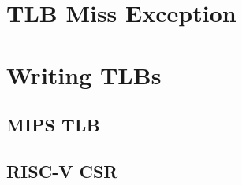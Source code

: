 



\section{TLB Miss Exception}






\section{Writing TLBs}
%

\subsection{MIPS TLB}

\subsection{RISC-V CSR}

